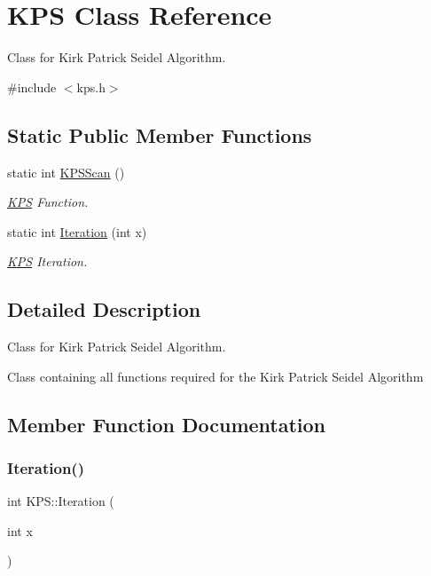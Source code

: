 \hypertarget{class_k_p_s}{}\section{K\+PS Class Reference}
\label{class_k_p_s}


Class for Kirk Patrick Seidel Algorithm.  




{\ttfamily \#include $<$kps.\+h$>$}

\subsection*{Static Public Member Functions}
\begin{DoxyCompactItemize}
\item 
static int \mbox{\hyperlink{class_k_p_s_a539e5edac3833f7b2c79398c93543d4e}{K\+P\+S\+Scan}} ()
\begin{DoxyCompactList}\small\item\em \mbox{\hyperlink{class_k_p_s}{K\+PS}} Function. \end{DoxyCompactList}\item 
static int \mbox{\hyperlink{class_k_p_s_a3e0fd1b78c8b56dc6b47314530cbefe3}{Iteration}} (int x)
\begin{DoxyCompactList}\small\item\em \mbox{\hyperlink{class_k_p_s}{K\+PS}} Iteration. \end{DoxyCompactList}\end{DoxyCompactItemize}


\subsection{Detailed Description}
Class for Kirk Patrick Seidel Algorithm. 

Class containing all functions required for the Kirk Patrick Seidel Algorithm 

\subsection{Member Function Documentation}
\mbox{\label{class_k_p_s_a3e0fd1b78c8b56dc6b47314530cbefe3}} 
\subsubsection{\texorpdfstring{Iteration()}{Iteration()}}
{\footnotesize\ttfamily int K\+P\+S\+::\+Iteration (\begin{DoxyParamCaption}\item[{int}]{x }\end{DoxyParamCaption})\hspace{0.3cm}{\ttfamily [static]}}



